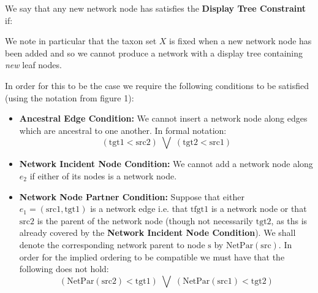 \documentclass[11pt]{article}
\begin{document}
We say that any new network node has satisfies the \textbf{Display Tree Constraint} if:

\vspace{4mm}
\vspace{4mm}

\noindent We note in particular that the taxon set $X$ is fixed when a new network node has been added and so we cannot produce a network with a display tree containing \textit{new} leaf nodes.

In order for this to be the case we require the following conditions to be satisfied (using the notation from figure 1):

\begin{itemize}

\item \textbf{Ancestral Edge Condition: } We cannot insert a network node along edges which are ancestral to one another. In formal notation:
  \[ (\mathrm{tgt1} < \mathrm{src2})\; \bigvee \; (\mathrm{tgt2} < \mathrm{src1}) \]

\item \textbf{Network Incident Node Condition: } We cannot add a network node along $e_2$ if either of its nodes is a network node.
 

\item \textbf{Network Node Partner Condition: }
Suppose that either $e_1=(\mathrm{src1}, \mathrm{tgt1})$ is a network edge i.e. that $\mathrm{tfgt1}$ is a network node or that $\mathrm{src2}$ is the parent of the network node (though not necessarily $\mathrm{tgt2}$, as ths is already covered by the \textbf{Network Incident Node Condition}). We shall denote the corresponding network parent to node $\mathrm{s}$ by $\mathrm{NetPar}(\mathrm{src})$. In order for the implied ordering to be compatible we must have that the following does not hold:
 \[ (\mathrm{NetPar(src2)} < \mathrm{tgt1})\; \bigvee \; (\mathrm{NetPar(src1)} < \mathrm{tgt2}) \]

\end{itemize}
\end{document}
